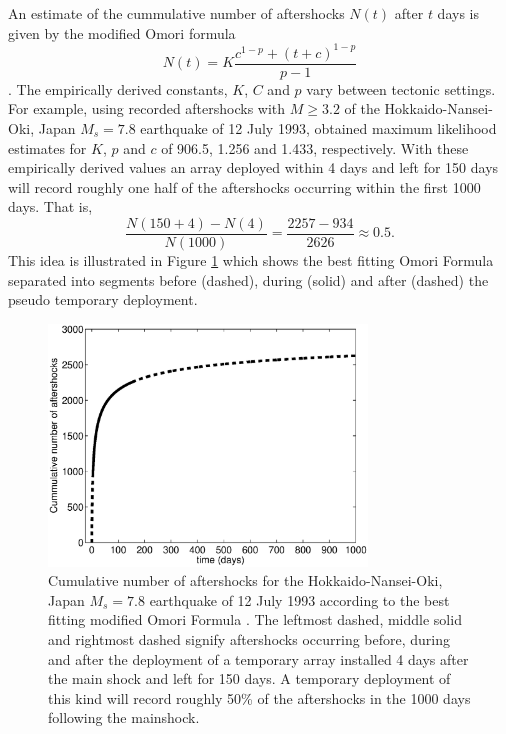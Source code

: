 \documentclass[extra]{gji}
\begin{document}
An estimate of the cummulative number of aftershocks $N(t)$ after 
$t$ days is given by the modified Omori formula
\begin{equation}
N(t) = K \frac{c^{1-p} + (t+c)^{1-p}}{p-1}
\end{equation}
\citep{dr_Utsu95a}.
The empirically derived constants, $K$, $C$ and $p$ vary between
tectonic settings. For example, using recorded aftershocks with
$M\ge3.2$ of the  Hokkaido-Nansei-Oki, Japan $M_s=7.8$ earthquake of
12 July 1993, \citet{dr_Utsu95a} obtained maximum likelihood
estimates for $K$, $p$ and $c$ of 906.5, 1.256 and 1.433,
respectively.  With these empirically derived values an array
deployed within 4 days and left for 150 days will record roughly one
half of the aftershocks occurring within the first 1000 days. That
is,
\begin{equation}
\frac{N(150+4)-N(4)}{N(1000)} = \frac{2257-934}{2626} \approx 0.5.
\end{equation}
This idea is illustrated in Figure \ref{fig:Omorifigure} which shows
the best fitting Omori Formula separated into segments before
(dashed), during (solid) and after (dashed) the pseudo temporary
deployment.

\begin{figure}
\noindent\includegraphics[width = 20pc]{diags/OmoriFigure.eps}
\caption{Cumulative number of aftershocks for the
Hokkaido-Nansei-Oki, Japan $M_s=7.8$ earthquake of 12 July 1993
according to the best fitting modified Omori Formula
\citep{dr_Utsu95a}. The leftmost dashed, middle solid and rightmost
dashed signify aftershocks occurring before, during and after the
deployment of a temporary array installed 4 days after the main
shock and left for 150 days. A temporary deployment of this kind
will record roughly 50\% of the aftershocks in the 1000 days
following the mainshock. } \label{fig:Omorifigure}
\end{figure}
\end{document}
